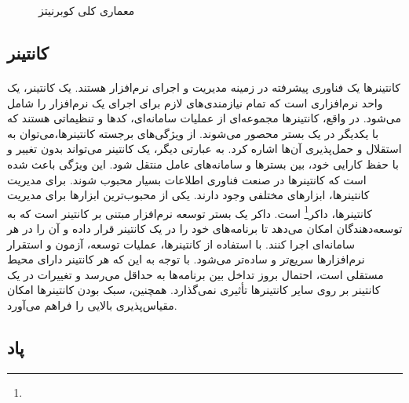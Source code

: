 {\begin{enumerate}
    \end{enumerate}
    \begin{figure}[H]
        \caption{معماری کلی کوبرنیتز}
        \label{fig:kube_compontents}
    \end{figure}
}

\subsection{کانتینر‌}
\label{subsec:containers}
\paragraph{}
{
    کانتینرها یک فناوری پیشرفته در زمینه مدیریت و اجرای نرم‌افزار هستند. یک کانتینر، یک واحد نرم‌افزاری است که تمام نیازمندی‌های
    لازم برای اجرای یک نرم‌افزار را شامل می‌شود. در واقع، کانتینرها مجموعه‌ای از عملیات سامانه‌ای، کدها و تنظیماتی هستند که با 
    یکدیگر در یک بستر محصور می‌شوند. از ویژگی‌های برجسته کانتینرها،می‌توان به استقلال و حمل‌پذیری آن‌ها اشاره کرد. به عبارتی دیگر،
    یک کانتینر می‌تواند بدون تغییر و با حفظ کارایی خود، بین بستر‌ها و سامانه‌‌های عامل‌ منتقل شود. این ویژگی باعث شده است که کانتینرها
    در صنعت فناوری اطلاعات بسیار محبوب شوند. برای مدیریت کانتینرها، ابزارهای مختلفی وجود دارند. یکی از محبوب‌ترین ابزارها برای مدیریت کانتینرها،
    داکر\footnote{}
    است. داکر یک بستر توسعه نرم‌افزار مبتنی بر کانتینر است که به توسعه‌دهندگان امکان می‌دهد تا برنامه‌های خود را در یک کانتینر قرار داده و آن را در
    هر سامانه‌ای اجرا کنند. با استفاده از کانتینرها، عملیات توسعه، آزمون و استقرار نرم‌افزارها سریع‌تر و ساده‌تر می‌شود. با توجه به این که هر کانتینر
    دارای محیط مستقلی است، احتمال بروز تداخل بین برنامه‌ها به حداقل می‌رسد و تغییرات در یک کانتینر بر روی سایر کانتینرها تأثیری نمی‌گذارد. همچنین،
    سبک بودن کانتینرها امکان مقیاس‌پذیری بالایی را فراهم می‌آورد.
}

\subsection{پاد}
\label{subsec:pod}
